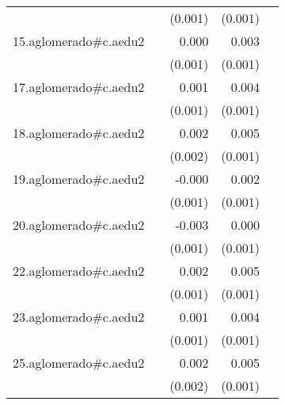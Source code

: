 {\begin{longtable}{l*{4}{D{.}{.}{-1}}}
            &                     &     (0.001)         &     (0.001)         &                     \\
\addlinespace
15.aglomerado#c.aedu2&                     &       0.000         &       0.003\sym{**} &                     \\
            &                     &     (0.001)         &     (0.001)         &                     \\
\addlinespace
17.aglomerado#c.aedu2&                     &       0.001         &       0.004\sym{***}&                     \\
            &                     &     (0.001)         &     (0.001)         &                     \\
\addlinespace
18.aglomerado#c.aedu2&                     &       0.002         &       0.005\sym{***}&                     \\
            &                     &     (0.002)         &     (0.001)         &                     \\
\addlinespace
19.aglomerado#c.aedu2&                     &      -0.000         &       0.002\sym{**} &                     \\
            &                     &     (0.001)         &     (0.001)         &                     \\
\addlinespace
20.aglomerado#c.aedu2&                     &      -0.003         &       0.000         &                     \\
            &                     &     (0.001)         &     (0.001)         &                     \\
\addlinespace
22.aglomerado#c.aedu2&                     &       0.002         &       0.005\sym{***}&                     \\
            &                     &     (0.001)         &     (0.001)         &                     \\
\addlinespace
23.aglomerado#c.aedu2&                     &       0.001         &       0.004\sym{***}&                     \\
            &                     &     (0.001)         &     (0.001)         &                     \\
\addlinespace
25.aglomerado#c.aedu2&                     &       0.002         &       0.005\sym{***}&                     \\
            &                     &     (0.002)         &     (0.001)         &                     \\

\end{longtable}}
